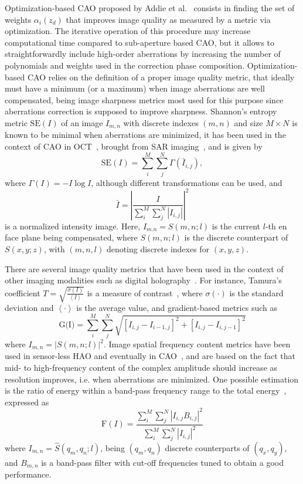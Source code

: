 Optimization-based CAO proposed by Addie et al.~\cite{Adie2012_Computational} consists in finding the set of weights $\alpha_i(z_d)$ that improves image quality as measured by a metric via optimization. The iterative operation of this procedure may increase computational time compared to sub-aperture based CAO, but it allows to straightforwardly include high-order aberrations by increasing the number of polynomials and weights used in the correction phase composition. Optimization-based CAO relies on the definition of a proper image quality metric, that ideally must have a minimum (or a maximum) when image aberrations are well compensated, being image sharpness metrics most used for this purpose since aberrations correction is supposed to improve sharpness. Shannon's entropy metric $\text{SE}(I)$ of an image $I_{m,n}$ with discrete indexes $(m,n)$ and size $M\times N$ is known to be minimal when aberrations are minimized, it has been used in the context of CAO in OCT~\cite{Hillmann2016_Aberrationfree}, brought from SAR imaging~\cite{Flores1992_Robust}, and is given by
\begin{equation}
	\text{SE}(I) = \sum_i^M\sum_j^N \Gamma(\bar{I}_{i,j}),
\end{equation}
where $\Gamma(I) = -I\log I$, although different transformations can be used, and
\begin{equation}
	\bar{I} = \left|\frac{I}{\sum_i^M\sum_j^N \left|I_{i,j}\right|}\right|^2
\end{equation}
is a normalized intensity image. Here, $I_{m.n}=S(m,n; l)$ is the current $l$-th en face plane being compensated, where $S(m,n; l)$ is the discrete counterpart of $S(x,y;z)$, with $(m,n,l)$ denoting discrete indexes for $(x,y,z)$.

There are several image quality metrics that have been used in the context of other imaging modalities such as digital holography~\cite{Trujillo2015_Comparative}. For instance, Tamura's coefficient $T = \sqrt{\frac{\sigma(I)}{\left<I\right>}}$ is a measure of contrast~\cite{Memmolo2011_Automatic}, where $\sigma(\cdot)$ is the standard deviation and $\left<\cdot\right>$ is the average value, and gradient-based metrics such as
\begin{equation}
	\text{G(I)} = \sum_i^M\sum_j^N \sqrt{\left[I_{i,j}-I_{i-1,j}\right] ^2 + \left[I_{i,j}-I_{i,j-1}\right] ^2}
\end{equation}
where $I_{m,n} = |S(m,n; l)| ^ 2$. Image spatial frequency content metrics have been used in sensor-less HAO and eventually in CAO~\cite{Debarre2007_Image}, and are based on the fact that mid- to high-frequency content of the complex amplitude should increase as resolution improves, i.e. when aberrations are minimized. One possible estimation is the ratio of energy within a band-pass frequency range to the total energy~\cite{Adie2012_Computational}, expressed as
\begin{equation}
	\text{F}(I) = \frac{\sum_i^M\sum_j^N |I_{i,j}B_{i,j}|^2 }{\sum_i^M\sum_j^N |I_{i,j}|^2}
\end{equation}
where $I_{m,n} = \hat{S}(q_m, q_n; l)$, being $(q_m, q_n)$ discrete counterparts of $(q_x, q_y)$, and $B_{m,n}$ is a band-pass filter with cut-off frequencies tuned to obtain a good performance.

